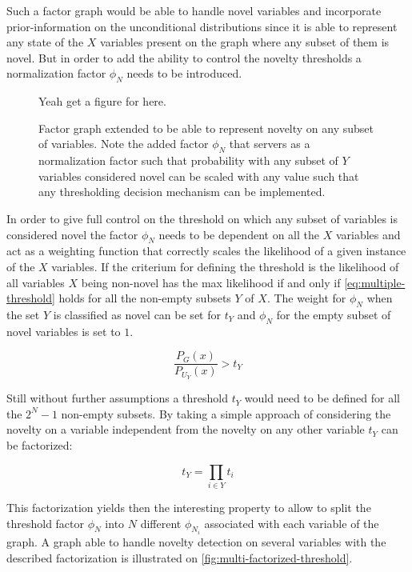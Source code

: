 Such a factor graph would be able to handle novel variables and incorporate
prior-information on the unconditional distributions since it is able to
represent any state of the $X$ variables present on the graph where any
subset of them is novel. But in order to add the ability to control the
novelty thresholds a normalization factor $\phi_N$ needs to be introduced.

\begin{figure}[h]
\centering
Yeah get a figure for here.
\caption{\label{fig:multiple-big-threshold}Factor graph extended to be able to
         represent novelty on any subset of variables. Note the added factor
         $\phi_N$ that servers as a normalization factor such that probability
         with any subset of $Y$ variables considered novel can be scaled with
         any value such that any thresholding decision mechanism can be
         implemented.}
\end{figure}

In order to give full control on the threshold on which any subset of
variables is considered novel the factor $\phi_N$ needs to be dependent on all
the $X$ variables and act as a weighting function that correctly scales the
likelihood of a given instance of the $X$ variables.
If the criterium for defining the threshold is the likelihood of all variables
$X$ being non-novel has the max likelihood if and only if
\autoref{eq:multiple-threshold} holds for all the non-empty subsets $Y$ of $X$.
The weight for $\phi_N$ when the set $Y$ is classified as novel
can be set for $t_Y$ and $\phi_N$ for the empty subset of novel variables is set
to $1$.

\begin{equation}
\label{eq:multiple-threshold}
\frac{P_G(x)}{P_{U_Y}(x)} > t_Y
\end{equation}

Still without further assumptions a threshold $t_Y$ would need to be defined for
all the $2^N-1$ non-empty subsets.
By taking a simple approach of considering the novelty on a variable independent
from the novelty on any other variable $t_Y$ can be factorized:

\begin{equation}
t_Y = \prod_{i \in Y}{t_i}
\end{equation}

This factorization yields then the interesting property to allow to split the
threshold factor $\phi_N$ into $N$ different $\phi_{N_i}$ associated with each
variable of the graph. A graph able to handle novelty detection on several
variables with the described factorization is illustrated on
\autoref{fig:multi-factorized-threshold}.

